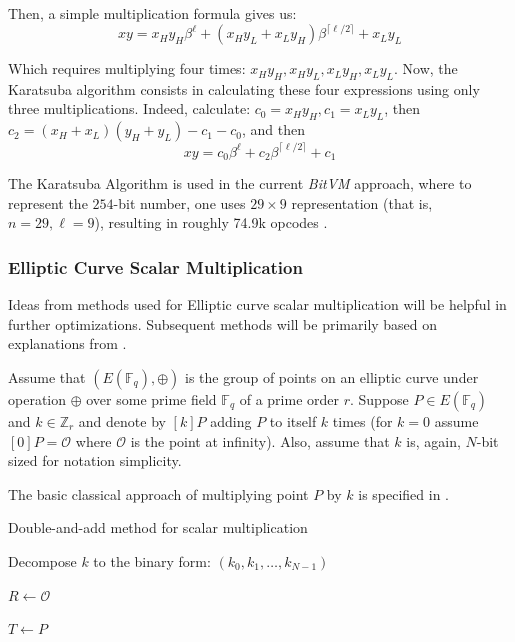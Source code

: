 \documentclass{iacrtrans}
\begin{document}
Then, a simple multiplication formula gives us:
\begin{equation}
    xy = x_Hy_H\beta^{\ell} + (x_Hy_L + x_Ly_H)\beta^{\lceil\ell/2\rceil} + x_Ly_L
\end{equation}

Which requires multiplying four times: $x_Hy_H,x_Hy_L,x_Ly_H,x_Ly_L$. Now, the Karatsuba algorithm consists in calculating these four expressions using only three multiplications. Indeed, calculate: $c_0 = x_Hy_H, c_1 = x_Ly_L$, then $c_2 = (x_H+x_L)(y_H+y_L)-c_1-c_0$, and then
\begin{equation}
    xy = c_0\beta^{\ell} + c_2\beta^{\lceil\ell/2\rceil} + c_1
\end{equation}

The Karatsuba Algorithm is used in the current \textit{BitVM} approach, where to represent the $254$-bit number, one uses $29\times 9$ representation (that is, $n=29,\ell=9$), resulting in roughly \textsf{74.9k} opcodes \cite{bitvm}.


\subsubsection{Elliptic Curve Scalar Multiplication}

Ideas from methods used for Elliptic curve scalar multiplication will be helpful in further optimizations. Subsequent methods will be primarily based on explanations from \cite{guide_ec}.

Assume that $(E(\mathbb{F}_q), \oplus)$ is the group of points on an elliptic curve under operation $\oplus$ over some prime field $\mathbb{F}_q$ of a prime order $r$. Suppose $P \in E(\mathbb{F}_q)$ and $k \in \mathbb{Z}_r$ and denote by $[k]P$ adding $P$ to itself $k$ times (for $k=0$ assume $[0]P = \mathcal{O}$ where $\mathcal{O}$ is the point at infinity). Also, assume that $k$ is, again, $N$-bit sized for notation simplicity.

The basic classical approach of multiplying point $P$ by $k$ is specified in . 

\begin{algorithm}
\caption{Double-and-add method for scalar multiplication}\label{alg:double_and_add}

Decompose $k$ to the binary form: $(k_0,k_1,\dots,k_{N-1})$

$R \gets \mathcal{O}$

$T \gets P$



\end{algorithm}
\end{document}
